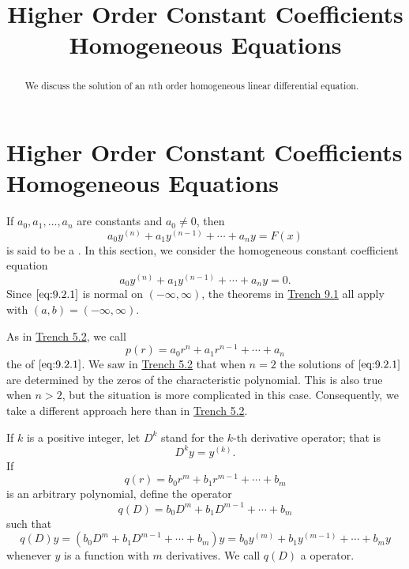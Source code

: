 \documentclass{ximera}
\title{Higher Order Constant Coefficients Homogeneous Equations}%
\begin{document}
\begin{abstract}
We discuss the solution of an $n$th order homogeneous linear differential equation.
\end{abstract}

\maketitle

\section*{Higher Order Constant Coefficients Homogeneous Equations}

If $a_0, a_1, \dots, a_n$ are constants and $a_0\neq 0$, then
$$
a_0y^{(n)}+a_1y^{(n-1)}+\cdots+a_ny=F(x)
$$
is said to be a .
In this section, we consider the homogeneous constant coefficient
equation
\begin{equation} \label{eq:9.2.1}
a_0y^{(n)}+a_1y^{(n-1)}+\cdots+a_ny=0.
\end{equation}
Since $\eqref{eq:9.2.1}$ is normal on $(-\infty,\infty)$, the theorems in
\href{https://ximera.osu.edu/ode/main/linearHigherOrder/linearHigherOrder}{Trench 9.1} all apply with $(a,b)=(-\infty,\infty)$.

As in \href{https://ximera.osu.edu/ode/main/constantCoefficientHomogeneousEquations/constantCoefficientHomogeneousEquations}{Trench 5.2}, we call
\begin{equation} \label{eq:9.2.2}
p(r)=a_0r^n+a_1r^{n-1}+\cdots+a_n
\end{equation}
the  of $\eqref{eq:9.2.1}$. We saw in
\href{https://xerxes.ximera.org/differentialequations/main/constantCoefficientHomogeneousEquations/constantCoefficientHomogeneousEquations}{Trench 5.2} that when $n=2$ the solutions of $\eqref{eq:9.2.1}$ are
determined by the zeros of the characteristic polynomial. This is also
true when $n>2$, but the situation is more complicated in this case.
Consequently, we take a different approach here than in
\href{https://xerxes.ximera.org/differentialequations/main/constantCoefficientHomogeneousEquations/constantCoefficientHomogeneousEquations}{Trench 5.2}.

If $k$ is a positive integer, let $D^k$ stand
for the $k$-th derivative operator;   that is
$$
D^ky=y^{(k)}.
$$
If
$$
q(r)=b_0r^m+b_1r^{m-1}+\cdots+b_m
$$
is an arbitrary polynomial,  define the operator
$$
q(D)=b_0D^m+b_1D^{m-1}+\cdots+b_m
$$
such that
$$
q(D)y=(b_0D^m+b_1D^{m-1}+\cdots+b_m)y=b_0y^{(m)}+b_1y^{(m-1)}+\cdots+
b_my
$$
whenever $y$ is a function with $m$ derivatives. We call $q(D)$
a   operator.
\end{document}
